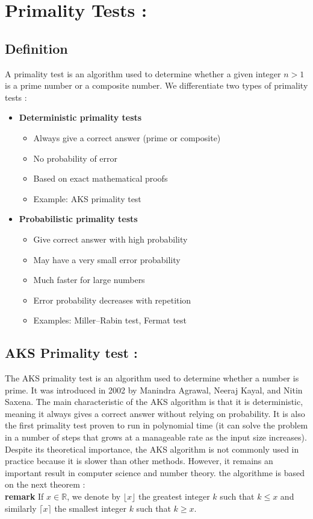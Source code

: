 \section{Primality Tests :} 
\subsection*{Definition }

A primality test is an algorithm used to determine whether a given integer \( n > 1 \) is a prime number or a composite number. We differentiate  two types of primality tests :
\begin{itemize}
    \item \textbf{Deterministic primality tests}
    \begin{itemize}
        \item Always give a correct answer (prime or composite)
        \item No probability of error
        \item Based on exact mathematical proofs
        \item Example: AKS primality test
    \end{itemize}
 \item \textbf{Probabilistic primality tests}
    \begin{itemize}
        \item Give correct answer with high probability
        \item May have a very small error probability
        \item Much faster for large numbers
        \item Error probability decreases with repetition
        \item Examples: Miller–Rabin test, Fermat test
    \end{itemize}
\end{itemize}
\subsection{AKS Primality test :}
The AKS primality test is an algorithm used to determine whether a number is prime. It was introduced in 2002 by Manindra Agrawal, Neeraj Kayal, and Nitin Saxena.
The main characteristic of the AKS algorithm is that it is deterministic, meaning it always gives a correct answer without relying on probability. It is also the first primality test proven to run in polynomial time (it can solve the problem in a number of steps that grows at a manageable rate as the input size increases).
Despite its theoretical importance, the AKS algorithm is not commonly used in practice because it is slower than other methods. However, it remains an important result in computer science and number theory. the algorithme is based on the next theorem :\\
\textbf{remark} If $x \in \mathbb{R}$, we denote by $\lfloor x \rfloor$ the greatest integer $k$ such that $k \le x$ and similarly $\lceil x \rceil$ the smallest integer $k$ such that $k \ge x$.

